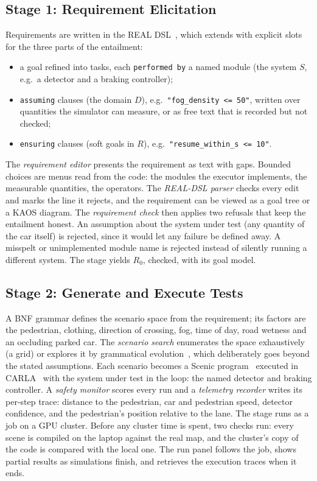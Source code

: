 \subsection{Stage 1: Requirement Elicitation}
\label{sec:specify}
Requirements are written in the REAL DSL~\cite{real2026}, which
\toolname{} extends with explicit slots for the three parts of the entailment:
\begin{itemize}
\item a goal refined into tasks, each \texttt{performed by} a named module
(the system $S$, e.g.\ a detector and a braking controller);
\item \texttt{assuming} clauses (the domain $D$), e.g.\
\texttt{"fog\_density <= 50"}, written over quantities the simulator can
measure, or as free text that is recorded but not checked;
\item \texttt{ensuring} clauses (soft goals in $R$), e.g.\
\texttt{"resume\_within\_s <= 10"}.
\end{itemize}
The \emph{requirement editor} presents the requirement as text with gaps.
Bounded choices are menus read from the code: the modules the executor
implements, the measurable quantities, the operators. The \emph{REAL-DSL parser}
checks every edit and marks the line it rejects, and the requirement can be
viewed as a goal tree or a KAOS diagram. The \emph{requirement check} then
applies two refusals that keep the entailment honest. An assumption about the
system under test (any quantity of the car itself) is rejected, since it
would let any failure be defined away. A misspelt or unimplemented module
name is rejected instead of silently running a different system. The stage
yields $R_0$, checked, with its goal model.

\subsection{Stage 2: Generate and Execute Tests}
\label{sec:generate}
A BNF grammar defines the scenario space from the requirement; its factors
are the pedestrian, clothing, direction of crossing, fog, time of day, road
wetness and an occluding parked car. The \emph{scenario search} enumerates
the space exhaustively (a grid) or explores it by grammatical
evolution~\cite{oneill2001,grape2022}, which deliberately goes beyond the
stated assumptions. Each scenario becomes a Scenic program~\cite{scenic2023}
executed in CARLA~\cite{carla2017} with the system under test in the loop:
the named detector and braking controller. A \emph{safety monitor} scores
every run and a \emph{telemetry recorder} writes its per-step trace:
distance to the pedestrian, car and pedestrian speed, detector confidence,
and the pedestrian's position relative to the lane. The stage runs as a job
on a GPU cluster. Before any cluster time is spent, two checks run: every
scene is compiled on the laptop against the real map, and the cluster's copy
of the code is compared with the local one. The run panel follows the job,
shows partial results as simulations finish, and retrieves the execution
traces when it ends.


